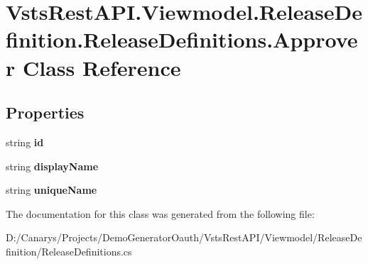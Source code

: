 \hypertarget{class_vsts_rest_a_p_i_1_1_viewmodel_1_1_release_definition_1_1_release_definitions_1_1_approver}{}\section{Vsts\+Rest\+A\+P\+I.\+Viewmodel.\+Release\+Definition.\+Release\+Definitions.\+Approver Class Reference}
\label{class_vsts_rest_a_p_i_1_1_viewmodel_1_1_release_definition_1_1_release_definitions_1_1_approver}
\subsection*{Properties}
\begin{DoxyCompactItemize}
\item 
\mbox{\label{class_vsts_rest_a_p_i_1_1_viewmodel_1_1_release_definition_1_1_release_definitions_1_1_approver_aef9118bf25b236ff48252f2001a7bcbc}} 
string {\bfseries id}
\item 
\mbox{\label{class_vsts_rest_a_p_i_1_1_viewmodel_1_1_release_definition_1_1_release_definitions_1_1_approver_a818ec1a441895767253d08fab1bd4702}} 
string {\bfseries display\+Name}
\item 
\mbox{\label{class_vsts_rest_a_p_i_1_1_viewmodel_1_1_release_definition_1_1_release_definitions_1_1_approver_a0014d4aa6c662a1ed9a7b19ca0fbe9bd}} 
string {\bfseries unique\+Name}
\end{DoxyCompactItemize}


The documentation for this class was generated from the following file\+:\begin{DoxyCompactItemize}
\item 
D\+:/\+Canarys/\+Projects/\+Demo\+Generator\+Oauth/\+Vsts\+Rest\+A\+P\+I/\+Viewmodel/\+Release\+Definition/Release\+Definitions.\+cs\end{DoxyCompactItemize}
